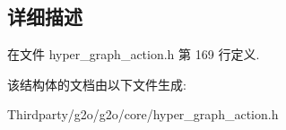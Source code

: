 \subsection{详细描述}


在文件 hyper\-\_\-graph\-\_\-action.\-h 第 169 行定义.



该结构体的文档由以下文件生成\-:\begin{DoxyCompactItemize}
\item 
Thirdparty/g2o/g2o/core/hyper\-\_\-graph\-\_\-action.\-h\end{DoxyCompactItemize}
